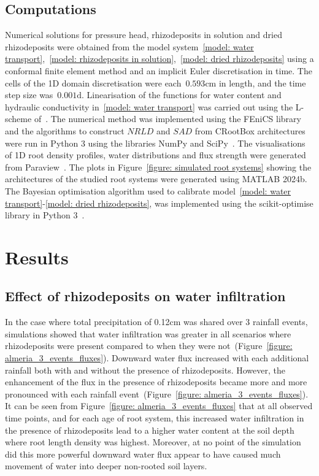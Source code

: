 \documentclass[11pt,a4paper]{article}
\numberwithin{equation}{section}
\begin{document}
\subsection{Computations}
Numerical solutions for pressure head, rhizodeposits in solution and dried rhizodeposits were obtained from the model system~\eqref{model: water transport},~\eqref{model: rhizodeposits in solution},~\eqref{model: dried rhizodeposits} using a conformal finite element method and an implicit Euler discretisation in time. The cells of the 1D domain discretisation were each~$0.593\text{cm}$ in length, and the time step size was~$ 0.001\text{d}$. Linearisation of the functions for water content and hydraulic conductivity in~\eqref{model: water transport} was carried out using the L-scheme of~\cite{list2016study}. The numerical method was implemented using the FEniCS library~\cite{AlnaesBlechta2015a} and the algorithms to construct $NRLD$ and $SAD$ from CRootBox architectures were run in Python 3 using the libraries NumPy and SciPy~\citep{harris2020array}. The visualisations of 1D root density profiles, water distributions and flux strength were generated from Paraview~\citep{ahrens2005paraview}. The plots in Figure~\ref{figure: simulated root systems} showing the architectures of the studied root systems were generated using MATLAB 2024b. The Bayesian optimisation algorithm used to calibrate model~\eqref{model: water transport}-\eqref{model: dried rhizodeposits}, was implemented using the scikit-optimise library in Python 3~\citep{tim_head_2018_1207017}. 

\section{Results}

\subsection{Effect of rhizodeposits on water infiltration}
In the case where total precipitation of 0.12cm was shared over 3 rainfall events, simulations showed that water infiltration was greater in all scenarios where rhizodeposits were present compared to when they were not~(Figure~\ref{figure: almeria_3_events_fluxes}). Downward water flux increased with each additional rainfall both with and without the presence of rhizodeposits. However, the enhancement of the flux in the presence of rhizodeposits became more and more pronounced with each rainfall event~(Figure~\ref{figure: almeria_3_events_fluxes}). It can be seen from Figure~\ref{figure: almeria_3_events_fluxes} that at all observed time points, and for each age of root system, this increased water infiltration in the presence of rhizodeposits lead to a higher water content at the soil depth where root length density was highest. Moreover, at no point of the simulation did this more powerful downward water flux appear to have caused much movement of water into deeper non-rooted soil layers.
\end{document}
